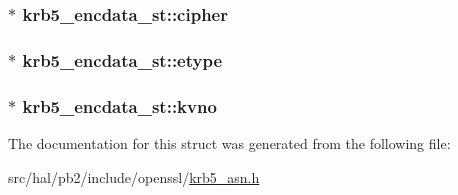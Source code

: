 \subsubsection[{\texorpdfstring{cipher}{cipher}}]{$\ast$ krb5\+\_\+encdata\+\_\+st\+::cipher}\hypertarget{structkrb5__encdata__st_a55de40ea971f2f93c618ea49322cbe0c}{}\label{structkrb5__encdata__st_a55de40ea971f2f93c618ea49322cbe0c}
\subsubsection[{\texorpdfstring{etype}{etype}}]{$\ast$ krb5\+\_\+encdata\+\_\+st\+::etype}\hypertarget{structkrb5__encdata__st_aa930746062320a82be3d81e363dd4ebf}{}\label{structkrb5__encdata__st_aa930746062320a82be3d81e363dd4ebf}
\subsubsection[{\texorpdfstring{kvno}{kvno}}]{$\ast$ krb5\+\_\+encdata\+\_\+st\+::kvno}\hypertarget{structkrb5__encdata__st_a30352f26d2741ac03df07c308f0bbb66}{}\label{structkrb5__encdata__st_a30352f26d2741ac03df07c308f0bbb66}


The documentation for this struct was generated from the following file\+:\begin{DoxyCompactItemize}
\item 
src/hal/pb2/include/openssl/\hyperlink{krb5__asn_8h}{krb5\+\_\+asn.\+h}\end{DoxyCompactItemize}
